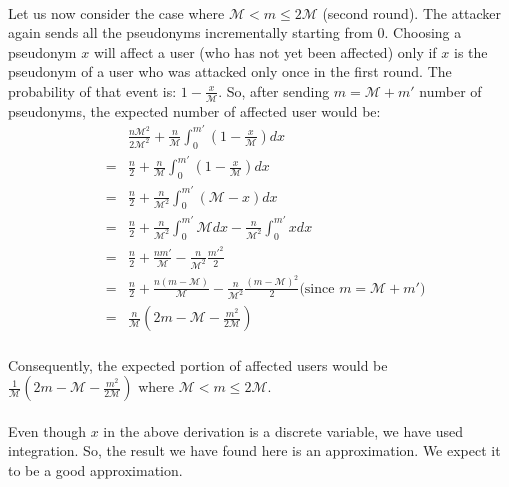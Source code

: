 \documentclass{llncs} %
\begin{document}
\begin{subappendices}
\paragraph{} Let us now consider the case where $\mathcal{M} < m \leq 2\mathcal{M}$ (second round). The attacker again sends all the pseudonyms incrementally starting from $0$. Choosing a pseudonym $x$ will affect a user (who has not yet been affected) only if $x$ is the pseudonym of a user who was attacked only once in the first round. The probability of that event is: $1 - \frac{x}{\mathcal{M}}$. So, after sending $m = \mathcal{M} + m'$ number of pseudonyms, the expected number of affected user would be:
\begin{eqnarray*}
 & & \frac{n\mathcal{M}^2}{2\mathcal{M}^2} + \frac{n}{\mathcal{M}} \int_{0}^{m'}\left(1 - \frac{x}{\mathcal{M}} \right)dx \\
 &=&  \frac{n}{2} + \frac{n}{\mathcal{M}} \int_{0}^{m'}\left(1 - \frac{x}{\mathcal{M}} \right)dx \\
 &=& \frac{n}{2} + \frac{n}{\mathcal{M}^2} \int_{0}^{m'}\left(\mathcal{M} - x \right)dx \\
 &=& \frac{n}{2} + \frac{n}{\mathcal{M}^2} \int_{0}^{m'} \mathcal{M} dx  - \frac{n}{\mathcal{M}^2} \int_{0}^{m'} x dx \\
  &=& \frac{n}{2} + \frac{nm'}{\mathcal{M}} - \frac{n}{\mathcal{M}^2} \frac{m'^2}{2} \\
  &=& \frac{n}{2} + \frac{n\left( m - \mathcal{M} \right)}{\mathcal{M}} - \frac{n}{\mathcal{M}^2} \frac{\left( m - \mathcal{M} \right)^2}{2} \text{(since }  m = \mathcal{M} + m' \text{)}\\
    &=& \frac{n}{\mathcal{M}} \left( 2m - \mathcal{M} - \frac{m^2}{2\mathcal{M}} \right) \\
\end{eqnarray*}

Consequently, the expected portion of affected users would be $\frac{1}{\mathcal{M}} \left( 2m - \mathcal{M} - \frac{m^2}{2\mathcal{M}} \right)$ where $\mathcal{M} < m \leq 2\mathcal{M}$.

\paragraph{} Even though $x$ in the above derivation is a discrete variable, we have used integration. So, the result we have found here is an approximation. We expect it to be a good approximation.


\end{subappendices}
\end{document}
